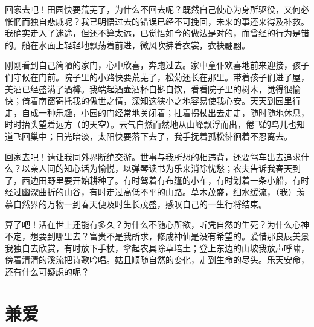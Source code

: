 \documentclass[12pt,UTF-8,openany]{ctexbook}
\begin{document}
\begin{normalsize}
    
    回家去吧！田园快要荒芜了，为什么不回去呢？既然自己使心为身所驱役，又何必怅惘而独自悲戚呢？我已明悟过去的错误已经不可挽回，未来的事还来得及补救。我确实走入了迷途，但还不算太远，已觉悟如今的做法是对的，而曾经的行为是错的。船在水面上轻轻地飘荡着前进，微风吹拂着衣裳，衣袂翩翩。
    
    刚刚看到自己简陋的家门，心中欣喜，奔跑过去。家中童仆欢喜地前来迎接，孩子们守候在门前。院子里的小路快要荒芜了，松菊还长在那里。带着孩子们进了屋，美酒已经盛满了酒樽。我端起酒壶酒杯自斟自饮，看看院子里的树木，觉得很愉快；倚着南窗寄托我的傲世之情，深知这狭小之地容易使我心安。天天到园里行走，自成一种乐趣，小园的门经常地关闭着；拄着拐杖出去走走，随时随地休息，时时抬头望着远方（的天空）。云气自然而然地从山峰飘浮而出，倦飞的鸟儿也知道飞回巢中；日光暗淡，太阳快要落下去了，我手抚着孤松徘徊着不忍离去。
    
    回家去吧！请让我同外界断绝交游。世事与我所想的相违背，还要驾车出去追求什么？以亲人间的知心话为愉悦，以弹琴读书为乐来消除忧愁；农夫告诉我春天到了，西边田野里要开始耕种了。有时驾着有布篷的小车，有时划着一条小船，有时经过幽深曲折的山谷，有时走过高低不平的山路。草木茂盛，细水缓流，（我）羡慕自然界的万物一到春天便及时生长茂盛，感叹自己的一生行将结束。
    
    算了吧！活在世上还能有多久？为什么不随心所欲，听凭自然的生死？为什么心神不定，想要到哪里去？富贵不是我所求，修成神仙是没有希望的。爱惜那良辰美景我独自去欣赏，有时放下手杖，拿起农具除草培土；登上东边的山坡我放声呼啸，傍着清清的溪流把诗歌吟唱。姑且顺随自然的变化，走到生命的尽头。乐天安命，还有什么可疑虑的呢？
    
\end{normalsize}



\chapter{兼爱}
\end{document}
